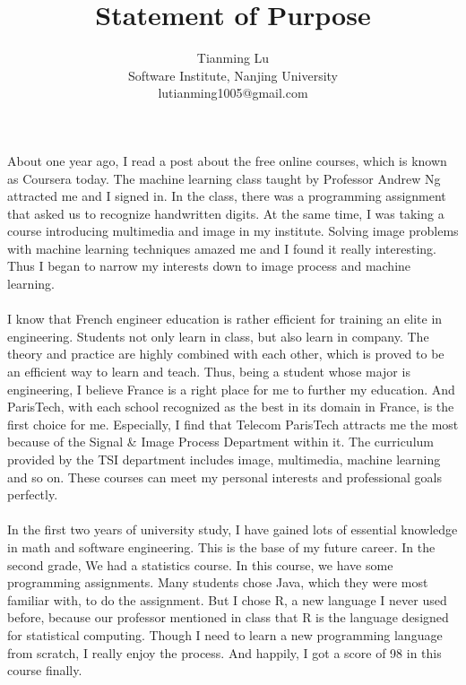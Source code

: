 \documentclass[a4paper]{article}
\title{Statement of Purpose}
\author{Tianming Lu \\
		Software Institute, Nanjing University\\
		lutianming1005@gmail.com}
\date{}
\begin{document}
\maketitle
\paragraph{}
About one year ago, I read a post about the free online courses, which is known as Coursera today. The machine learning class taught by Professor Andrew Ng attracted me and I signed in. In the class, there was a programming assignment that asked us to recognize handwritten digits. At the same time, I was taking a course introducing multimedia and image in my institute. Solving image problems with machine learning techniques amazed me and I found it really interesting. Thus I began to narrow my interests down to image process and machine learning.
\paragraph{}
I know that French engineer education is rather efficient for training an elite in engineering. Students not only learn in class, but also learn in company. The theory and practice are highly combined with each other, which is proved to be an efficient way to learn and teach. Thus, being a student whose major is engineering, I believe France is a right place for me to further my education. And ParisTech, with each school recognized as the best in its domain in France, is the first choice for me. Especially, I find that Telecom ParisTech attracts me the most because of the Signal \& Image Process Department within it. The curriculum provided by the TSI department includes image, multimedia, machine learning and so on. These courses can meet my personal interests and professional goals perfectly.
\paragraph{}
In the first two years of university study, I have gained lots of essential knowledge in math and software engineering. This is the base of my future career. In the second grade, We had a statistics course. In this course, we have some programming assignments. Many students chose Java, which they were most familiar with, to do the assignment. But I chose R, a new language I never used before, because our professor mentioned in class that R is the language designed for statistical computing. Though I need to learn a new programming language from scratch, I really enjoy the process. And happily, I got a score of 98 in this course finally.
\end{document}

